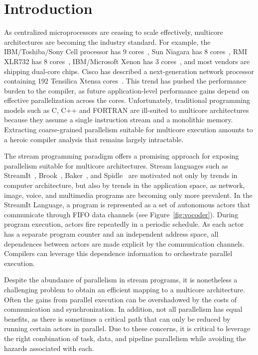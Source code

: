 \section{Introduction}


As centralized microprocessors are ceasing to scale effectively,
multicore architectures are becoming the industry standard.  For
example, the IBM/Toshiba/Sony Cell processor has 9
cores~\cite{Cell-hpca}, Sun Niagara has 8 cores~\cite{Niagara}, RMI
XLR732 has 8 cores~\cite{RMI-web}, IBM/Micro\-soft Xenon has 3
cores~\cite{xbox360}, and most vendors are shipping dual-core chips.
Cisco has described a next-generation network processor containing 192
Tensilica Xtensa cores~\cite{etherton05ancs}.
This trend has pushed the performance burden to the compiler, as
future application-level performance gains depend on effective
parallelization across the cores.  Unfortunately, traditional
programming models such as C, C++ and FORTRAN are ill-suited to
multicore architectures because they assume a single instruction
stream and a monolithic memory.  Extracting coarse-grained parallelism
suitable for multicore execution amounts to a heroic compiler analysis
that remains largely intractable.

The stream programming paradigm offers a promising approach for
exposing parallelism suitable for multicore architectures.  Stream
languages such as StreamIt~\cite{streamitcc}, Brook~\cite{brook04},
Baker~\cite{Baker}, and Spidle~\cite{spidle03} are motivated not only by
trends in computer architecture, but also by trends in the application
space, as network, image, voice, and multimedia programs are becoming
only more prevalent.  In the StreamIt Language, a program is represented
as a set of autonomous actors that communicate through FIFO data
channels (see Figure~\ref{fig:vocoder}).  During program execution,
actors fire repeatedly in a periodic schedule.  As each actor has a
separate program counter and an independent address space, all
dependences between actors are made explicit by the communication
channels.  Compilers can leverage this dependence information to
orchestrate parallel execution.

Despite the abundance of parallelism in stream programs, it is
nonetheless a challenging problem to obtain an efficient mapping to a
multicore architecture.  Often the gains from parallel execution can
be overshadowed by the costs of communication and synchronization.  In
addition, not all parallelism has equal benefits, as there is
sometimes a critical path that can only be reduced by running certain
actors in parallel.  Due to these concerns, it is critical to leverage
the right combination of task, data, and pipeline parallelism while
avoiding the hazards associated with each.

